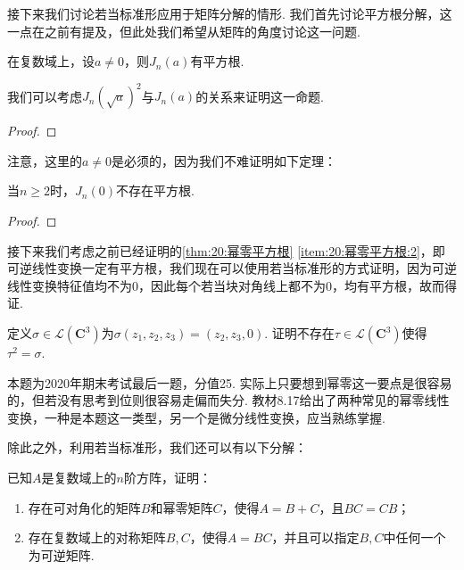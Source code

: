 \begin{solution}

\end{solution}

接下来我们讨论若当标准形应用于矩阵分解的情形. 我们首先讨论平方根分解，这一点在之前有提及，但此处我们希望从矩阵的角度讨论这一问题.
\begin{theorem}
    在复数域上，设$a\neq 0$，则$J_n(a)$有平方根.
\end{theorem}
我们可以考虑$J_n(\sqrt{a})^2$与$J_n(a)$的关系来证明这一命题.

\begin{proof}

\end{proof}

注意，这里的$a\neq 0$是必须的，因为我们不难证明如下定理：
\begin{theorem}
    当$n\geqslant 2$时，$J_n(0)$不存在平方根.
\end{theorem}

\begin{proof}

\end{proof}

接下来我们考虑之前已经证明的\autoref{thm:20:幂零平方根} \ref*{item:20:幂零平方根:2}，即可逆线性变换一定有平方根，我们现在可以使用若当标准形的方式证明，因为可逆线性变换特征值均不为0，因此每个若当块对角线上都不为0，均有平方根，故而得证.
\begin{example}
    定义$\sigma\in \mathcal{L}(\mathbf{C}^3)$为$\sigma(z_1,z_2,z_3)=(z_2,z_3,0)$. 证明不存在$\tau\in \mathcal{L}(\mathbf{C}^3)$使得$\tau^2=\sigma$.
\end{example}

\begin{solution}

\end{solution}

本题为2020年期末考试最后一题，分值25. 实际上只要想到幂零这一要点是很容易的，但若没有思考到位则很容易走偏而失分. 教材8.17给出了两种常见的幂零线性变换，一种是本题这一类型，另一个是微分线性变换，应当熟练掌握.

除此之外，利用若当标准形，我们还可以有以下分解：
\begin{example}
    已知$A$是复数域上的$n$阶方阵，证明：
    \begin{enumerate}
        \item 存在可对角化的矩阵$B$和幂零矩阵$C$，使得$A=B+C$，且$BC=CB$；

        \item 存在复数域上的对称矩阵$B,C$，使得$A=BC$，并且可以指定$B,C$中任何一个为可逆矩阵.
    \end{enumerate}
\end{example}

